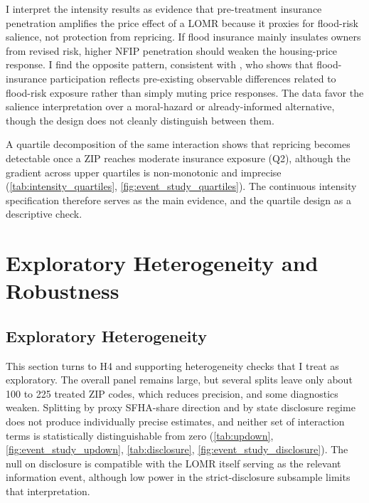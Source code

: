 \documentclass[12pt]{article}
\begin{document}
I interpret the intensity results as evidence that pre-treatment insurance penetration amplifies the price effect of a LOMR because it proxies for flood-risk salience, not protection from repricing. If flood insurance mainly insulates owners from revised risk, higher NFIP penetration should weaken the housing-price response. I find the opposite pattern, consistent with \citet{Wagner2022}, who shows that flood-insurance participation reflects pre-existing observable differences related to flood-risk exposure rather than simply muting price responses. The data favor the salience interpretation over a moral-hazard or already-informed alternative, though the design does not cleanly distinguish between them.

A quartile decomposition of the same interaction shows that repricing becomes detectable once a ZIP reaches moderate insurance exposure (Q2), although the gradient across upper quartiles is non-monotonic and imprecise (\autoref{tab:intensity_quartiles}, \autoref{fig:event_study_quartiles}). The continuous intensity specification therefore serves as the main evidence, and the quartile design as a descriptive check.
\FloatBarrier



\section{Exploratory Heterogeneity and Robustness}\label{sec:robustness}

\subsection{Exploratory Heterogeneity}\label{sec:heterogeneity}

This section turns to H4 and supporting heterogeneity checks that I treat as exploratory. The overall panel remains large, but several splits leave only about 100 to 225 treated ZIP codes, which reduces precision, and some diagnostics weaken. Splitting by proxy SFHA-share direction and by state disclosure regime does not produce individually precise estimates, and neither set of interaction terms is statistically distinguishable from zero (\autoref{tab:updown}, \autoref{fig:event_study_updown}, \autoref{tab:disclosure}, \autoref{fig:event_study_disclosure}). The null on disclosure is compatible with the LOMR itself serving as the relevant information event, although low power in the strict-disclosure subsample limits that interpretation.
\end{document}
